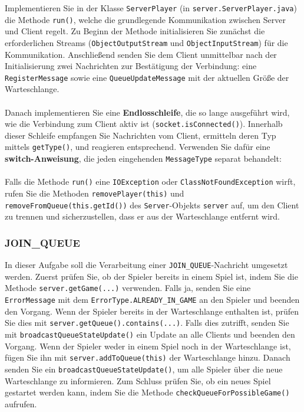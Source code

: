 \documentclass[12pt]{article}
\begin{document}
Implementieren Sie in der Klasse \texttt{ServerPlayer} (in \texttt{server.ServerPlayer.java}) die Methode \texttt{run()}, 
welche die grundlegende Kommunikation zwischen Server und Client regelt. 
Zu Beginn der Methode initialisieren Sie zunächst die erforderlichen Streams 
(\texttt{ObjectOutputStream} und \texttt{ObjectInputStream}) für die Kommunikation. 
Anschließend senden Sie dem Client unmittelbar nach der Initialisierung zwei Nachrichten zur Bestätigung der Verbindung: 
eine \texttt{RegisterMessage} sowie eine \texttt{QueueUpdateMessage} mit der aktuellen Größe der Warteschlange.
\\ \\
Danach implementieren Sie eine \textbf{Endlosschleife}, die so lange ausgeführt wird, 
wie die Verbindung zum Client aktiv ist (\texttt{socket.isConnected()}). 
Innerhalb dieser Schleife empfangen Sie Nachrichten vom Client, ermitteln deren Typ mittels \texttt{getType()}, 
und reagieren entsprechend. Verwenden Sie dafür eine \textbf{switch-Anweisung}, 
die jeden eingehenden \texttt{MessageType} separat behandelt:
\\ \\ 
Falls die Methode \texttt{run()} eine \texttt{IOException} oder \texttt{ClassNotFoundException} wirft, 
rufen Sie die Methoden \texttt{removePlayer(this)} und \texttt{removeFromQueue(this.getId())} des \texttt{Server}-Objekts \texttt{server} auf, 
um den Client zu trennen und sicherzustellen, dass er aus der Warteschlange entfernt wird.

\subsubsection*{JOIN\_QUEUE}

In dieser Aufgabe soll die Verarbeitung einer \texttt{JOIN\_QUEUE}-Nachricht umgesetzt werden. 
Zuerst prüfen Sie, ob der Spieler bereits in einem Spiel ist, indem Sie die Methode \texttt{server\hspace{0pt}.getGame(...)} verwenden. 
Falls ja, senden Sie eine \texttt{ErrorMessage} mit dem \texttt{ErrorType.ALREADY\_IN\_GAME} an den Spieler und beenden den Vorgang. 
Wenn der Spieler bereits in der Warteschlange enthalten ist, prüfen Sie dies mit \texttt{server\hspace{0pt}.getQueue()\hspace{0pt}.contains(...)}. 
Falls dies zutrifft, senden Sie mit \texttt{broadcastQueue\hspace{0pt}StateUpdate()} ein Update an alle Clients und beenden den Vorgang. 
Wenn der Spieler weder in einem Spiel noch in der Warteschlange ist, fügen Sie ihn mit \texttt{server\hspace{0pt}.addToQueue(this)} der Warteschlange hinzu. 
Danach senden Sie ein \texttt{broadcastQueue\hspace{0pt}StateUpdate()}, um alle Spieler über die neue Warteschlange zu informieren. 
Zum Schluss prüfen Sie, ob ein neues Spiel gestartet werden kann, indem Sie die Methode \texttt{checkQueueForPossibleGame()} aufrufen.
\end{document}
